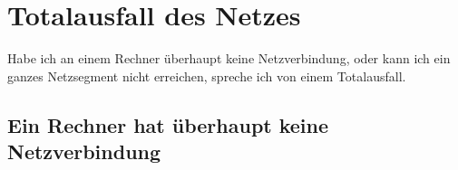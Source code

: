 \chapter{Totalausfall des Netzes}
\label{cha:netz-totalausfall}

\begin{abstractsec}
  Habe ich an einem Rechner überhaupt keine Netzverbindung, oder kann ich ein
  ganzes Netzsegment nicht erreichen, spreche ich von einem Totalausfall.
\end{abstractsec}

\section{Ein Rechner hat überhaupt keine Netzverbindung}
\label{sec:gar-kein-netz}

